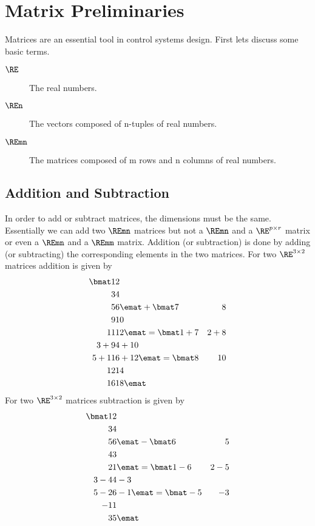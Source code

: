 \chapter{Matrix Preliminaries}\label{c-matrix}

Matrices are an essential tool in control systems design.  First lets discuss some basic terms.
\begin{description}
    \item[$\RE$] The real numbers.
    \item[$\REn$] The vectors composed of n-tuples of real numbers.
    \item[$\REmn$] The matrices composed of m rows and n columns of real numbers.
\end{description}

\section{Addition and Subtraction}

In order to add or subtract matrices, the dimensions must be the same.  Essentially we can add two $\REmn$ matrices but not a $\REmn$ and a $\RE^{p\times r}$ matrix or even a $\REmn$ and a $\REmm$ matrix.  Addition (or subtraction) is done by adding (or subtracting) the corresponding elements in the two matrices.  For two $\RE^{3\times 2}$ matrices addition is given by
\begin{eqnarray}
\bmat
1 & 2 \\
3 & 4 \\
5 & 6
\emat
+
\bmat
7  & 8 \\
9  & 10 \\
11 & 12
\emat
=
\bmat
1+7  & 2+8 \\
3+9  & 4+10 \\
5+11 & 6+12
\emat
=
\bmat
8   & 10 \\
12  & 14 \\
16  & 18
\emat
\end{eqnarray}
For two $\RE^{3\times 2}$ matrices subtraction is given by
\begin{eqnarray}
\bmat
1 & 2 \\
3 & 4 \\
5 & 6
\emat
-
\bmat
6  & 5 \\
4  & 3 \\
2  & 1
\emat
=
\bmat
1-6  & 2-5 \\
3-4  & 4-3 \\
5-2  & 6-1
\emat
=
\bmat
-5  & -3 \\
-1  & 1  \\
3   & 5
\emat
\end{eqnarray}



